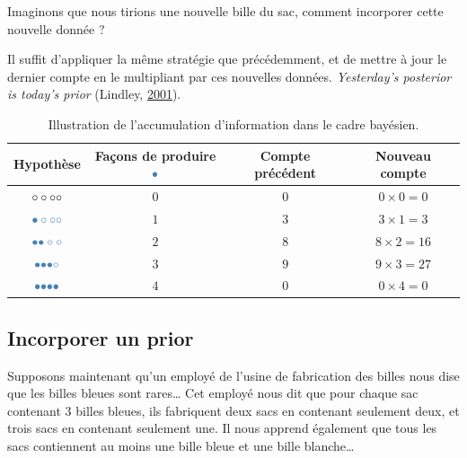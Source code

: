 \documentclass[
  a4paper,11pt,twoside,onecolumn,openright,final,oldfontcommands]{memoir}
\theoremstyle{definition}
\theoremstyle{definition}
\theoremstyle{definition}
\theoremstyle{remark}
\begin{document}
Imaginons que nous tirions une nouvelle bille du sac, comment incorporer cette nouvelle donnée ?

Il suffit d'appliquer la même stratégie que précédemment, et de mettre à jour le dernier compte en le multipliant par ces nouvelles données. \emph{Yesterday's posterior is today's prior} (Lindley, \protect\hyperlink{ref-lindley_philosophy_2001}{2001}).

\begin{table}[!htb]

\begin{center}
\begin{threeparttable}

\caption{\label{tab:accumulation}Illustration de l'accumulation d'information dans le cadre bayésien.}

\begin{tabular}{cccc}
\toprule
Hypothèse & Façons de produire $\color{steelblue}{\bullet}$ & Compte précédent & Nouveau compte\\
\midrule
$\LARGE \circ \circ \circ \circ$ & $0$ & $0$ & $0 \times 0 = 0$\\
$\LARGE \color{steelblue}{\bullet} \circ \circ \circ$ & $1$ & $3$ & $3 \times 1 = 3$\\
$\LARGE \color{steelblue}{\bullet} \color{steelblue}{\bullet} \circ \circ$ & $2$ & $8$ & $8 \times 2 = 16$\\
$\LARGE \color{steelblue}{\bullet} \color{steelblue}{\bullet} \color{steelblue}{\bullet} \circ$ & $3$ & $9$ & $9 \times 3 = 27$\\
$\LARGE \color{steelblue}{\bullet} \color{steelblue}{\bullet} \color{steelblue}{\bullet} \color{steelblue}{\bullet}$ & $4$ & $0$ & $0 \times 4 = 0$\\
\bottomrule
\end{tabular}

\end{threeparttable}
\end{center}

\end{table}

\hypertarget{incorporer-un-prior}{%
\subsection{Incorporer un prior}\label{incorporer-un-prior}}

Supposons maintenant qu'un employé de l'usine de fabrication des billes nous dise que les billes bleues sont rares\ldots{} Cet employé nous dit que pour chaque sac contenant 3 billes bleues, ils fabriquent deux sacs en contenant seulement deux, et trois sacs en contenant seulement une. Il nous apprend également que tous les sacs contiennent au moins une bille bleue et une bille blanche\ldots{}
\end{document}
